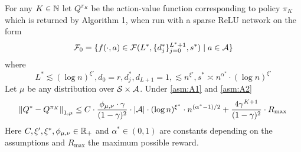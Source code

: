 \begin{thm} \label{thm:main}
	For any $K \in \mathbb{N}$ let $Q^{\pi_K}$ be the action-value function
	corresponding to policy $\pi_K$ which is returned by Algorithm 1,
	when run with a sparse ReLU network on the form
	\[ \mathcal{F}_0 = \{f(\cdot, a) \in \mathcal{F}(L^*, \{d_j^*\}_{j=0}^{L^*+1},s^*)
		\mid a \in \mathcal{A} \} \]
	where
	\[ L^* \lesssim (\log n)^{\xi'}, d_0 = r, d_j^*, d_{L+1}=1, \lesssim n^{\xi'},
		s^* \asymp n^{\alpha^*} \cdot (\log n)^{\xi'} \]
	Let $\mu$ be any distribution over $\mathcal{S} \times \mathcal{A}$.
	Under \cref{asm:A1} and \cref{asm:A2} 
	\[ \norm{Q^* - Q^{\pi_K}}_{1,\mu} \leq C \cdot \frac{\phi_{\mu,\nu}
			\cdot \gamma}{(1-\gamma)^2}
			\cdot |\mathcal{A}| \cdot (\log n)^{\xi^*} \cdot n^{(\alpha^* - 1)/2} 
			+ \frac{4 \gamma^{K+1}}{(1-\gamma)^2} \cdot R_{\max} \]
	Here $C, \xi', \xi^*, \phi_{\mu,\nu} \in \mathbb{R}_{+}$ and $\alpha^* \in (0,1)$
	are constants depending on the assumptions
	and $R_{\max}$ the maximum possible reward.
\end{thm}


